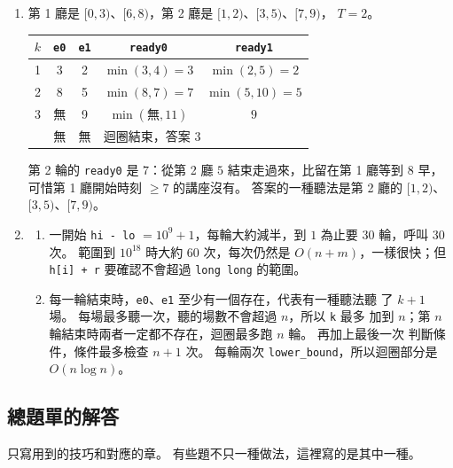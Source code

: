 \begin{enumerate}
\item 第 1 廳是 $[0, 3)$、$[6, 8)$，第 2 廳是 $[1, 2)$、$[3, 5)$、$[7, 9)$，
$T = 2$。
\begin{center}
\begin{tabular}{ccccc}
\toprule
$k$ & \texttt{e0} & \texttt{e1} & \texttt{ready0} & \texttt{ready1} \\
\midrule
1 & 3 & 2 & $\min(3, 4) = 3$ & $\min(2, 5) = 2$ \\
2 & 8 & 5 & $\min(8, 7) = 7$ & $\min(5, 10) = 5$ \\
3 & 無 & 9 & $\min(\text{無}, 11)$ & $9$ \\
\midrule
 & 無 & 無 & \multicolumn{2}{l}{迴圈結束，答案 $3$} \\
\bottomrule
\end{tabular}
\end{center}
第 2 輪的 \texttt{ready0} 是 $7$：從第 2 廳 $5$ 結束走過來，比留在第 1 廳等到
$8$ 早，可惜第 1 廳開始時刻 $\ge 7$ 的講座沒有。 答案的一種聽法是第 2 廳的
$[1, 2)$、$[3, 5)$、$[7, 9)$。

\item
\begin{enumerate}
\item 一開始 \texttt{hi - lo} $= 10^9 + 1$，每輪大約減半，到 $1$ 為止要
$30$ 輪，呼叫 $30$ 次。 範圍到 $10^{18}$ 時大約 $60$ 次，每次仍然是
$O(n + m)$，一樣很快；但 \texttt{h[i] + r} 要確認不會超過 \texttt{long long}
的範圍。
\item 每一輪結束時，\texttt{e0}、\texttt{e1} 至少有一個存在，代表有一種聽法聽
了 $k + 1$ 場。 每場最多聽一次，聽的場數不會超過 $n$，所以 \texttt{k} 最多
加到 $n$；第 $n$ 輪結束時兩者一定都不存在，迴圈最多跑 $n$ 輪。 再加上最後一次
判斷條件，條件最多檢查 $n + 1$ 次。 每輪兩次 \texttt{lower\_bound}，所以迴圈部分是 $O(n \log n)$。
\end{enumerate}
\end{enumerate}

\subsection*{總題單的解答}

只寫用到的技巧和對應的章。 有些題不只一種做法，這裡寫的是其中一種。

